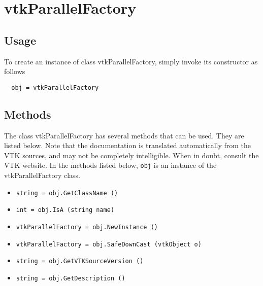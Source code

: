 \section{vtkParallelFactory}

\subsection{Usage}


To create an instance of class vtkParallelFactory, simply
invoke its constructor as follows
\begin{verbatim}
  obj = vtkParallelFactory
\end{verbatim}
\subsection{Methods}

The class vtkParallelFactory has several methods that can be used.
  They are listed below.
Note that the documentation is translated automatically from the VTK sources,
and may not be completely intelligible.  When in doubt, consult the VTK website.
In the methods listed below, \verb|obj| is an instance of the vtkParallelFactory class.
\begin{itemize}
\item  \verb|string = obj.GetClassName ()|

\item  \verb|int = obj.IsA (string name)|

\item  \verb|vtkParallelFactory = obj.NewInstance ()|

\item  \verb|vtkParallelFactory = obj.SafeDownCast (vtkObject o)|

\item  \verb|string = obj.GetVTKSourceVersion ()|

\item  \verb|string = obj.GetDescription ()|

\end{itemize}
